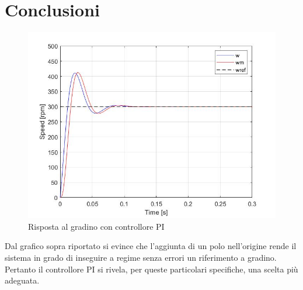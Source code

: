 \documentclass[a4paper,11pt, Arial]{article}
\begin{document}
\section{Conclusioni}
\begin{figure}[H]
\centering
\includegraphics[scale=0.3]{pi.jpg}
\caption{Risposta al gradino con controllore PI}
\end{figure}
Dal grafico sopra riportato si evince che l'aggiunta di un polo nell'origine rende il sistema in grado di inseguire a regime senza errori un riferimento a gradino. Pertanto il controllore PI si rivela, per queste particolari specifiche, una scelta più adeguata.
\end{document}
